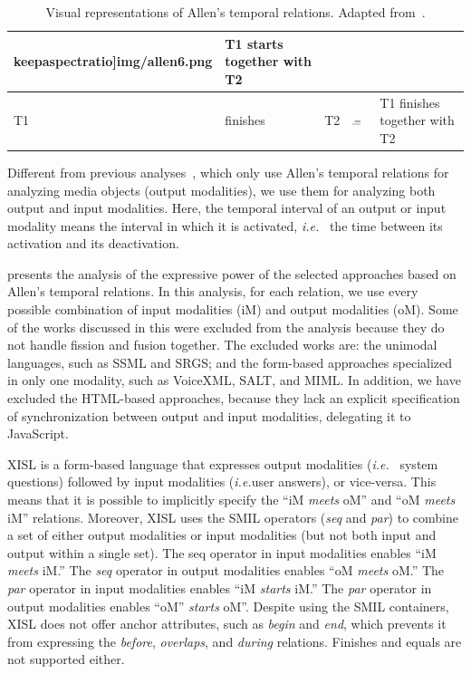 \begin{table}[b]
\begin{tabular}{ l l l m{3cm} m{7cm} }
	keepaspectratio]{img/allen6.png} & T1 starts together with T2 \\
	\hline
	T1 &	finishes &	T2 &	\includegraphics[width=1.5cm,
	keepaspectratio]{img/allen7.png} & T1 finishes together with T2 \\
	\hline
\end{tabular}
\caption[Visual representations of Allen’s temporal relations.]{Visual
representations of Allen’s temporal relations. Adapted
from~\cite{allen_maintaining_1983}.}
\label{table:allen}
\end{table}

Different from previous analyses~\cite{huang_synchronization_1998}, which only
use Allen’s temporal relations for analyzing media objects (output modalities),
we use them for analyzing both output and input modalities. Here, the temporal
interval of an output or input modality means the interval in which it is
activated, \textit{i.e.}~ the time between its activation and its deactivation.

 presents the analysis of the expressive power of the
selected approaches based on Allen’s temporal relations. In this analysis, for
each relation, we use every possible combination of input modalities (iM) and
output modalities (oM). Some of the works discussed in this  were
excluded from the analysis because they do not handle fission and fusion
together. The
excluded works are: the unimodal languages, such as SSML and SRGS; and the
form-based approaches specialized in only one modality, such as VoiceXML, SALT,
and MIML. In addition, we have excluded the HTML-based approaches, because they
lack an explicit specification of synchronization between output and input
modalities, delegating it to JavaScript.

XISL is a form-based language that expresses output modalities (\textit{i.e.}~ system
questions) followed by input modalities (\textit{i.e.}user answers), or
vice-versa. This
means that it is possible to implicitly specify the “iM \textit{meets} oM” and
“oM \textit{meets} iM” relations. Moreover, XISL uses the SMIL operators
(\textit{seq} and
\textit{par}) to combine a set of either output modalities or input modalities
(but not both input and output within a single set). The seq operator in input
modalities enables “iM \textit{meets} iM.” The \textit{seq} operator in output
modalities enables “oM \textit{meets} oM.” The \textit{par} operator in input
modalities enables “iM \textit{starts} iM.” The
\textit{par} operator in output modalities enables “oM” \textit{starts} oM”.
Despite using the SMIL containers, XISL does not offer anchor attributes, such
as \textit{begin} and
\textit{end}, which prevents it from expressing the \textit{before},
\textit{overlaps}, and
\textit{during} relations. Finishes and equals are not supported either.

